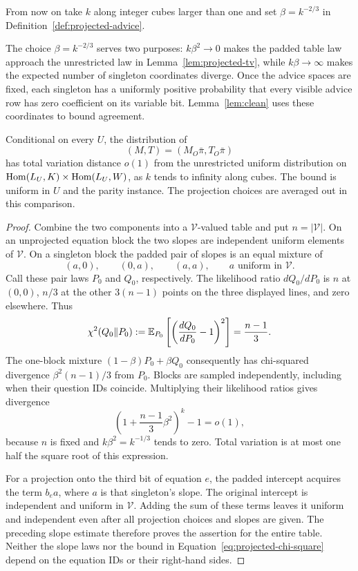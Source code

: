 From now on take $k$ along integer cubes larger than one and set
$\beta=k^{-2/3}$ in Definition~\ref{def:projected-advice}.

The choice $\beta=k^{-2/3}$ serves two purposes: $k\beta^2\to0$ makes
the padded table law approach the unrestricted law in
Lemma~\ref{lem:projected-tv}, while $k\beta\to\infty$ makes the expected
number of singleton coordinates diverge.  Once the advice spaces are
fixed, each singleton has a uniformly positive probability that every
visible advice row has zero coefficient on its variable bit.
Lemma~\ref{lem:clean} uses these coordinates to bound agreement.

\begin{lemma}
\label{lem:projected-tv}
Conditional on every $U$, the distribution of
\[
 (M,T)=(M_O\bar\pi,T_O\bar\pi)
\]
has total variation distance $o(1)$ from the unrestricted uniform
distribution on $\operatorname{Hom}(L_U,K)\times\operatorname{Hom}(L_U,W)$, as $k$ tends to
infinity along cubes.  The bound is uniform in $U$ and the parity instance.
The projection choices are averaged out in this comparison.
\end{lemma}

\begin{proof}
Combine the two components into a $\mathcal V$-valued table and put
$n=|\mathcal V|$.  On an unprojected equation block the two slopes are
independent uniform elements of $\mathcal V$.  On a singleton block the
padded pair of slopes is an equal mixture of
\[
 (a,0),\qquad (0,a),\qquad (a,a),
 \qquad a\text{ uniform in }\mathcal V.
\]
Call these pair laws $P_0$ and $Q_0$, respectively.  The likelihood ratio
$dQ_0/dP_0$ is $n$ at $(0,0)$, $n/3$ at the other $3(n-1)$ points on
the three displayed lines, and zero elsewhere.  Thus
\[
 \chi^2(Q_0\Vert P_0)
 :=\mathbb E_{P_0}\left[\left(\frac{dQ_0}{dP_0}-1\right)^2\right]
 =\frac{n-1}{3}.
\]
The one-block mixture $(1-\beta)P_0+\beta Q_0$ consequently has
chi-squared divergence $\beta^2(n-1)/3$ from $P_0$.  Blocks are sampled
independently, including when their question IDs coincide.  Multiplying
their likelihood ratios gives divergence
\begin{equation}
 \left(1+\frac{n-1}{3}\beta^2\right)^k-1=o(1),
 \label{eq:projected-chi-square}
\end{equation}
because $n$ is fixed and $k\beta^2=k^{-1/3}$ tends to zero.  Total
variation is at most one half the square root of this expression.

For a projection onto the third bit of equation $e$, the padded intercept
acquires the term $b_e a$, where $a$ is that singleton's slope.  The
original intercept is independent and uniform in $\mathcal V$.  Adding
the sum of these terms leaves it uniform and independent even after all
projection choices and slopes are given.  The preceding slope estimate
therefore proves the assertion for the entire table.  Neither the slope
laws nor the bound in Equation~\eqref{eq:projected-chi-square} depend on
the equation IDs or their right-hand sides.
\end{proof}

